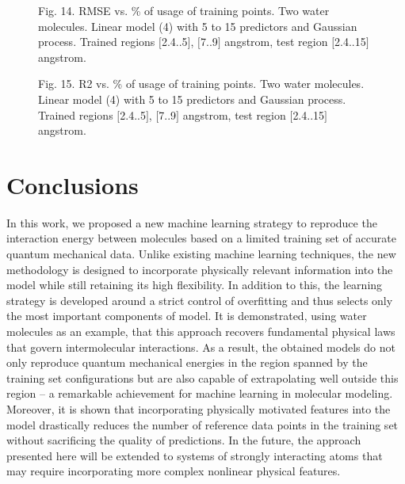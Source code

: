 \documentclass[aps,prl,reprint,amsmath,amssymb,nature]{revtex4-1}
\begin{document}
\begin{figure}[h]
\centering
\caption{Fig. 14. RMSE vs. \% of usage of training points. Two water 
molecules. Linear model (4) with 5 to 15 predictors and Gaussian 
process. Trained regions $[$2.4..5$]$, $[$7..9$]$ angstrom, test region 
$[$2.4..15$]$ angstrom.}
\end{figure}


\begin{figure}[h]
\centering
\caption{Fig. 15. R2 vs. \% of usage of training points. Two water 
molecules. Linear model (4) with 5 to 15 predictors and Gaussian 
process. Trained regions $[$2.4..5$]$, $[$7..9$]$ angstrom, test region 
$[$2.4..15$]$ angstrom.}
\end{figure}


\section{Conclusions}

In this work, we proposed a new machine learning strategy to reproduce the interaction energy between molecules based on a limited training set of accurate quantum mechanical data. Unlike existing machine learning techniques, the new methodology is designed to incorporate physically relevant information into the model while still retaining its high flexibility. In addition to this, the learning strategy is developed around a strict control of overfitting and thus selects only the most important components of model. 
It is demonstrated, using water molecules as an example, that this approach recovers fundamental physical laws that govern intermolecular interactions. As a result, the obtained models do not only reproduce quantum mechanical energies in the region spanned by the training set configurations but are also capable of extrapolating well outside this region -- a remarkable achievement for machine learning in molecular modeling. Moreover, it is shown that incorporating physically motivated features into the model drastically reduces the number of reference data points in the training set without sacrificing the quality of predictions. 
In the future, the approach presented here will be extended to systems of strongly interacting atoms 
that may require incorporating more complex nonlinear physical features. 
\end{document}
